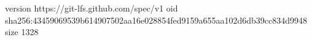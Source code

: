 version https://git-lfs.github.com/spec/v1
oid sha256:43459069539b614907502aa16e028854fed9159a655aa102d6db39cc834d9948
size 1328

